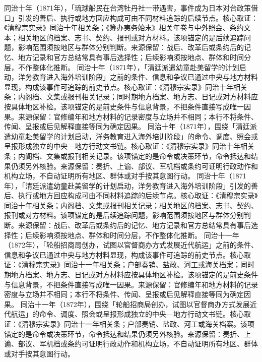 同治十年（1871年），「琉球船民在台湾牡丹社一带遇害，事件成为日本对台政策借口」引发的善后、执行或地方回应构成可由不同材料追踪的后续节点。核心取证：《清穆宗实录》同治十年相关条；《筹办夷务始末》相关年卷与中外照会、条约文本；相关地区的档案、志书、契约、报刊或对方材料。该项锚定的是后续追踪问题，影响范围须按地区与群体分别判断。来源保留：战后、改革后或条约后的记忆、地方记录和官方总结常具有事后选择性；后续影响须按地点、群体和时间分层，不作整体化推断。
同治十年（1871年），「清廷派遣幼童赴美留学的计划启动，洋务教育进入海外培训阶段」之前的条件、信息和争议已通过中央与地方材料显现，构成该事件可追踪的前史节点。核心取证：《清穆宗实录》同治十年相关条；内阁档、文集或报刊相关记录；同时期地方档案、地方志、日记或对方材料应按具体地区补检。该项锚定的是前史条件与信息背景，不把条件直接写成唯一因果。来源保留：官修编年和地方材料的记录密度与立场并不相同；本行不将条件、传闻、呈报或后见解释直接等同为确定因果。
同治十年（1871年），围绕「清廷派遣幼童赴美留学的计划启动，洋务教育进入海外培训阶段」的命令、调度、照会或呈报形成独立的中央—地方行动文书链。核心取证：《清穆宗实录》同治十年相关条；内阁档、文集或报刊相关记录。该项锚定的是命令或决策环节，命令抵达和结果仍须另外核验。来源保留：奏折、上谕、部议、军机档或条约可证明行政动作和机构立场，不自动证明所有地区、群体或对手按其意图行动。
同治十年（1871年），「清廷派遣幼童赴美留学的计划启动，洋务教育进入海外培训阶段」引发的善后、执行或地方回应构成可由不同材料追踪的后续节点。核心取证：《清穆宗实录》同治十年相关条；内阁档、文集或报刊相关记录；相关地区的档案、志书、契约、报刊或对方材料。该项锚定的是后续追踪问题，影响范围须按地区与群体分别判断。来源保留：战后、改革后或条约后的记忆、地方记录和官方总结常具有事后选择性；后续影响须按地点、群体和时间分层，不作整体化推断。
同治十一年（1872年），「轮船招商局创办，试图以官督商办方式发展近代航运」之前的条件、信息和争议已通过中央与地方材料显现，构成该事件可追踪的前史节点。核心取证：《清穆宗实录》同治十一年相关条；户部奏销、盐政、河工或海关档案；同时期地方档案、地方志、日记或对方材料应按具体地区补检。该项锚定的是前史条件与信息背景，不把条件直接写成唯一因果。来源保留：官修编年和地方材料的记录密度与立场并不相同；本行不将条件、传闻、呈报或后见解释直接等同为确定因果。
同治十一年（1872年），围绕「轮船招商局创办，试图以官督商办方式发展近代航运」的命令、调度、照会或呈报形成独立的中央—地方行动文书链。核心取证：《清穆宗实录》同治十一年相关条；户部奏销、盐政、河工或海关档案。该项锚定的是命令或决策环节，命令抵达和结果仍须另外核验。来源保留：奏折、上谕、部议、军机档或条约可证明行政动作和机构立场，不自动证明所有地区、群体或对手按其意图行动。
